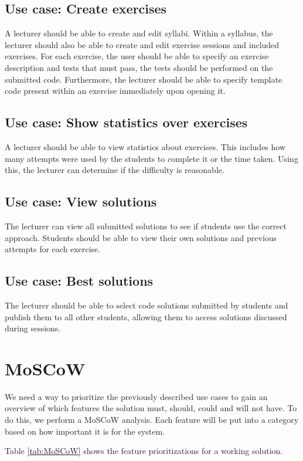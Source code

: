 \subsection*{Use case: Create exercises}
A lecturer should be able to create and edit syllabi.
Within a syllabus, the lecturer should also be able to create and edit exercise sessions and included exercises.
For each exercise, the user should be able to specify an exercise description and tests that must pass, the tests should be performed on the submitted code. Furthermore, the lecturer should be able to specify template code present within an exercise immediately upon opening it.

\subsection*{Use case: Show statistics over exercises}
A lecturer should be able to view statistics about exercises.
This includes how many attempts were used by the students to complete it or the time taken.
Using this, the lecturer can determine if the difficulty is reasonable.

\subsection*{Use case: View solutions}
The lecturer can view all submitted solutions to see if students use the correct approach.
Students should be able to view their own solutions and previous attempts for each exercise.

\subsection*{Use case: Best solutions}
The lecturer should be able to select code solutions submitted by students and publish them to all other students, allowing them to access solutions discussed during sessions.

\section{MoSCoW} \label{sec:MoSCoW}
We need a way to prioritize the previously described use cases to gain an overview of which features the solution must, should, could and will not have.
To do this, we perform a MoSCoW analysis.
Each feature will be put into a category based on how important it is for the system.

Table \ref{tab:MoSCoW} shows the feature prioritizations for a working solution.

